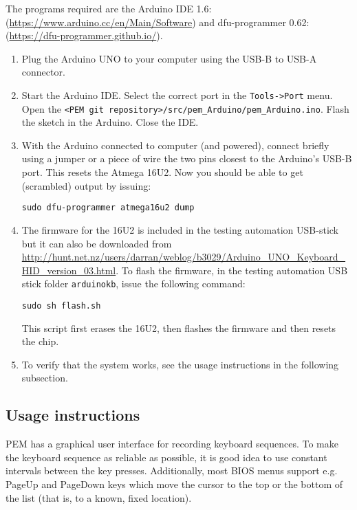 \documentclass[a4paper,11pt]{article}
\newcommand{\cmd}[1]{\texttt{#1}}
\begin{document}
The programs required are the Arduino IDE 1.6: (\url{https://www.arduino.cc/en/Main/Software}) and dfu-programmer 0.62: (\url{https://dfu-programmer.github.io/}).

\begin{enumerate}
\item Plug the Arduino UNO to your computer using the USB-B to USB-A connector.

\item Start the Arduino IDE. Select the correct port in the \cmd{Tools->Port} menu. Open the \cmd{<PEM git repository>/src/pem\_Arduino/pem\_Arduino.ino}. Flash the sketch in the Arduino. Close the IDE.

\item With the Arduino connected to computer (and powered), connect briefly using a jumper or a piece of wire the two pins closest to the Arduino's USB-B port. This resets the Atmega 16U2. Now you should be able to get (scrambled) output by issuing:
\begin{lstlisting}
sudo dfu-programmer atmega16u2 dump
\end{lstlisting}

\item The firmware for the 16U2 is included in the testing automation USB-stick but it can also be downloaded from \url{http://hunt.net.nz/users/darran/weblog/b3029/Arduino_UNO_Keyboard_HID_version_03.html}. To flash the firmware, in the testing automation USB stick folder \cmd{arduinokb}, issue the following command:
\begin{lstlisting}
sudo sh flash.sh
\end{lstlisting}
This script first erases the 16U2, then flashes the firmware and then resets the chip.

\item To verify that the system works, see the usage instructions in the following subsection.
\end{enumerate}

\subsection{Usage instructions}
PEM has a graphical user interface for recording keyboard sequences. To make the keyboard sequence as reliable as possible, it is good idea to use constant intervals between the key presses. Additionally, most BIOS menus support e.g. PageUp and PageDown keys which move the cursor to the top or the bottom of the list (that is, to a known, fixed location).
\end{document}
